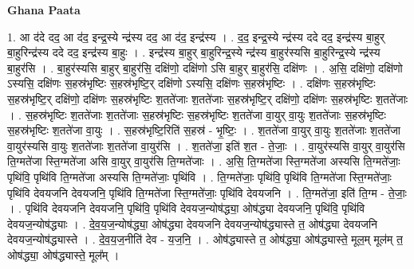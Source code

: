 \documentclass[17pt]{extarticle}
\begin{document}
\textbf{Ghana Paata } \newline

1. आ द॑दे दद॒ आ द॑द॒ इन्द्र॒स्ये न्द्र॑स्य दद॒ आ द॑द॒ इन्द्र॑स्य । . द॒द॒ इन्द्र॒स्ये न्द्र॑स्य ददे दद॒ इन्द्र॑स्य बा॒हुर् बा॒हुरिन्द्र॑स्य ददे दद॒ इन्द्र॑स्य बा॒हुः । . इन्द्र॑स्य बा॒हुर् बा॒हुरिन्द्र॒स्ये न्द्र॑स्य बा॒हुर॑स्यसि बा॒हुरिन्द्र॒स्ये न्द्र॑स्य बा॒हुर॑सि । . बा॒हुर॑स्यसि बा॒हुर् बा॒हुर॑सि॒ दक्षि॑णो॒ दक्षि॑णो ऽसि बा॒हुर् बा॒हुर॑सि॒ दक्षि॑णः । . अ॒सि॒ दक्षि॑णो॒ दक्षि॑णो ऽस्यसि॒ दक्षि॑णः स॒हस्र॑भृष्टिः स॒हस्र॑भृष्टि॒र् दक्षि॑णो ऽस्यसि॒ दक्षि॑णः स॒हस्र॑भृष्टिः । . दक्षि॑णः स॒हस्र॑भृष्टिः स॒हस्र॑भृष्टि॒र् दक्षि॑णो॒ दक्षि॑णः स॒हस्र॑भृष्टिः श॒तते॑जाः श॒तते॑जाः स॒हस्र॑भृष्टि॒र् दक्षि॑णो॒ दक्षि॑णः स॒हस्र॑भृष्टिः श॒तते॑जाः । . स॒हस्र॑भृष्टिः श॒तते॑जाः श॒तते॑जाः स॒हस्र॑भृष्टिः स॒हस्र॑भृष्टिः श॒तते॑जा वा॒युर् वा॒युः श॒तते॑जाः स॒हस्र॑भृष्टिः स॒हस्र॑भृष्टिः श॒तते॑जा वा॒युः । . स॒हस्र॑भृष्टि॒रिति॑ स॒हस्र॑ - भृ॒ष्टिः॒ । . श॒तते॑जा वा॒युर् वा॒युः श॒तते॑जाः श॒तते॑जा वा॒युर॑स्यसि वा॒युः श॒तते॑जाः श॒तते॑जा वा॒युर॑सि । . श॒तते॑जा॒ इति॑ श॒त - ते॒जाः॒ । . वा॒युर॑स्यसि वा॒युर् वा॒युर॑सि ति॒ग्मते॑जा स्ति॒ग्मते॑जा असि वा॒युर् वा॒युर॑सि ति॒ग्मते॑जाः । . अ॒सि॒ ति॒ग्मते॑जा स्ति॒ग्मते॑जा अस्यसि ति॒ग्मते॑जाः॒ पृथि॑वि॒ पृथि॑वि ति॒ग्मते॑जा अस्यसि ति॒ग्मते॑जाः॒ पृथि॑वि । . ति॒ग्मते॑जाः॒ पृथि॑वि॒ पृथि॑वि ति॒ग्मते॑जा स्ति॒ग्मते॑जाः॒ पृथि॑वि देवयजनि देवयजनि॒ पृथि॑वि ति॒ग्मते॑जा स्ति॒ग्मते॑जाः॒ पृथि॑वि देवयजनि । . ति॒ग्मते॑जा॒ इति॑ ति॒ग्म - ते॒जाः॒ । . पृथि॑वि देवयजनि देवयजनि॒ पृथि॑वि॒ पृथि॑वि देवयज॒न्योष॑द्ध्या॒ ओष॑द्ध्या देवयजनि॒ पृथि॑वि॒ पृथि॑वि देवयज॒न्योष॑द्ध्याः । . दे॒व॒य॒ज॒न्योष॑द्ध्या॒ ओष॑द्ध्या देवयजनि देवयज॒न्योष॑द्ध्यास्ते त॒ ओष॑द्ध्या देवयजनि देवयज॒न्योष॑द्ध्यास्ते । . दे॒व॒य॒ज॒नीति॑ देव - य॒ज॒नि॒ । . ओष॑द्ध्यास्ते त॒ ओष॑द्ध्या॒ ओष॑द्ध्यास्ते॒ मूल॒म् मूल॑म् त॒ ओष॑द्ध्या॒ ओष॑द्ध्यास्ते॒ मूल᳚म् । \newline
\end{document}
